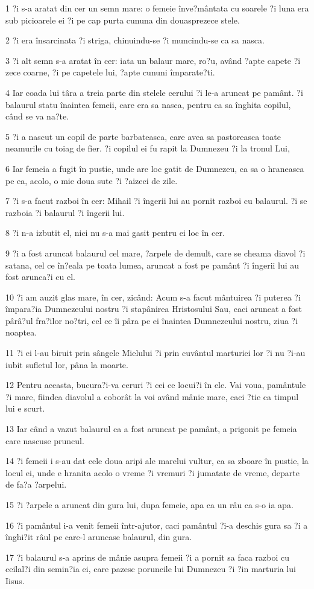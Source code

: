 \par 1 ?i s-a aratat din cer un semn mare: o femeie înve?mântata cu soarele ?i luna era sub picioarele ei ?i pe cap purta cununa din douasprezece stele.
\par 2 ?i era însarcinata ?i striga, chinuindu-se ?i muncindu-se ca sa nasca.
\par 3 ?i alt semn s-a aratat în cer: iata un balaur mare, ro?u, având ?apte capete ?i zece coarne, ?i pe capetele lui, ?apte cununi împarate?ti.
\par 4 Iar coada lui târa a treia parte din stelele cerului ?i le-a aruncat pe pamânt. ?i balaurul statu înaintea femeii, care era sa nasca, pentru ca sa înghita copilul, când se va na?te.
\par 5 ?i a nascut un copil de parte barbateasca, care avea sa pastoreasca toate neamurile cu toiag de fier. ?i copilul ei fu rapit la Dumnezeu ?i la tronul Lui,
\par 6 Iar femeia a fugit în pustie, unde are loc gatit de Dumnezeu, ca sa o hraneasca pe ea, acolo, o mie doua sute ?i ?aizeci de zile.
\par 7 ?i s-a facut razboi în cer: Mihail ?i îngerii lui au pornit razboi cu balaurul. ?i se razboia ?i balaurul ?i îngerii lui.
\par 8 ?i n-a izbutit el, nici nu s-a mai gasit pentru ei loc în cer.
\par 9 ?i a fost aruncat balaurul cel mare, ?arpele de demult, care se cheama diavol ?i satana, cel ce în?eala pe toata lumea, aruncat a fost pe pamânt ?i îngerii lui au fost arunca?i cu el.
\par 10 ?i am auzit glas mare, în cer, zicând: Acum s-a facut mântuirea ?i puterea ?i împara?ia Dumnezeului nostru ?i stapânirea Hristosului Sau, caci aruncat a fost pârâ?ul fra?ilor no?tri, cel ce îi pâra pe ei înaintea Dumnezeului nostru, ziua ?i noaptea.
\par 11 ?i ei l-au biruit prin sângele Mielului ?i prin cuvântul marturiei lor ?i nu ?i-au iubit sufletul lor, pâna la moarte.
\par 12 Pentru aceasta, bucura?i-va ceruri ?i cei ce locui?i în ele. Vai voua, pamântule ?i mare, fiindca diavolul a coborât la voi având mânie mare, caci ?tie ca timpul lui e scurt.
\par 13 Iar când a vazut balaurul ca a fost aruncat pe pamânt, a prigonit pe femeia care nascuse pruncul.
\par 14 ?i femeii i s-au dat cele doua aripi ale marelui vultur, ca sa zboare în pustie, la locul ei, unde e hranita acolo o vreme ?i vremuri ?i jumatate de vreme, departe de fa?a ?arpelui.
\par 15 ?i ?arpele a aruncat din gura lui, dupa femeie, apa ca un râu ca s-o ia apa.
\par 16 ?i pamântul i-a venit femeii într-ajutor, caci pamântul ?i-a deschis gura sa ?i a înghi?it râul pe care-l aruncase balaurul, din gura.
\par 17 ?i balaurul s-a aprins de mânie asupra femeii ?i a pornit sa faca razboi cu ceilal?i din semin?ia ei, care pazesc poruncile lui Dumnezeu ?i ?in marturia lui Iisus.

